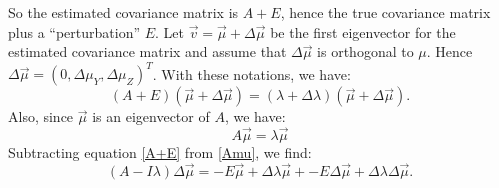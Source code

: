 \documentclass[12pt]{amsart}
\theoremstyle{definition}
\numberwithin{equation}{section}
\numberwithin{equation}{section}
\theoremstyle{remark}
\numberwithin{equation}{section}
\begin{document}
So the estimated covariance matrix is $A+E$, hence the true covariance matrix plus a ``perturbation'' $E$. Let $\vec{v}=\vec{\mu}+\Delta\vec{\mu}$ be the first eigenvector for the estimated covariance matrix and assume that $\Delta\vec{\mu}$ is orthogonal to $\mu$. Hence $\Delta\vec{\mu}=(0,\Delta\mu_Y,\Delta\mu_Z)^T$. With these notations, we have:
\begin{equation}
\label{A+E}
(A+E)(\vec{\mu}+\Delta\vec{\mu})
=(\lambda+\Delta\lambda)(\vec{\mu}+\Delta\vec{\mu}).
\end{equation}
Also, since $\vec{\mu}$ is an eigenvector of $A$,
we have:
\begin{equation}
\label{Amu}
A\vec{\mu}=\lambda\vec{\mu}
\end{equation}
Subtracting equation \ref{A+E} from \ref{Amu},
we find:
\begin{equation}
\label{noise}
(A-I\lambda)\Delta\vec{\mu}=-E\vec{\mu}+\Delta\lambda\vec{\mu}+
-E\Delta\vec{\mu}+\Delta\lambda\Delta\vec{\mu}.
\end{equation}
\end{document}
